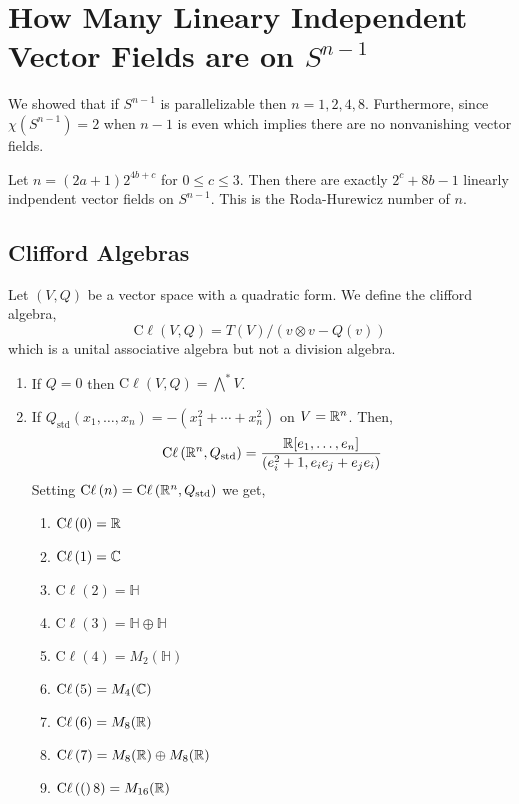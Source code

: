 \documentclass[12pt]{extarticle}
\renewcommand{\H}{\mathbb{H}}
\begin{document}
\begin{prop}

\end{prop}

\section{How Many Lineary Independent Vector Fields are on $S^{n-1}$}

We showed that if $S^{n-1}$ is parallelizable then $n = 1,2,4,8$. Furthermore, since $\chi(S^{n-1}) = 2$ when $n-1$ is even which implies there are no nonvanishing vector fields.

\begin{thm}[Adams]
Let $n = (2a + 1) 2^{4b + c}$ for $0 \le c \le 3$. Then there are exactly $2^c + 8b - 1$ linearly indpendent vector fields on $S^{n-1}$. This is the Roda-Hurewicz number of $n$.
\end{thm}

\subsection{Clifford Algebras}

\newcommand{\Cl}[1]{\mathrm{C}\ell \left( #1 \right)}

\begin{defn}
Let $(V, Q)$ be a vector space with a quadratic form. We define the clifford algebra, 
\[ \Cl{V,Q} = T(V) / (v \otimes v - Q(v)) \] 
which is a unital associative algebra but not a division algebra. 
\end{defn}

\begin{example}
\begin{enumerate}
\item If $Q = 0$ then $\Cl{V, Q} = \bigwedge^{*} V$.
\item If $Q_{\mathrm{std}}(x_1, \dots, x_n) = -(x_1^2 + \cdots + x_n^2)$ on $V = \mathbb{R}^n$. Then,
\[ \Cl{\R^n, Q_{\mathrm{std}}} = \frac{\R[e_1, \dots, e_n]}{(e_i^2 + 1, e_i e_j + e_j e_i)} \] Setting $\Cl{n} = \Cl{\R^n, Q_{\mathrm{std}}}$ we get,
\begin{enumerate}
\item $\Cl{0} = \R$
\item $\Cl{1} = \C$
\item $\Cl{2} = \H$
\item $\Cl{3} = \H \oplus \H$
\item $\Cl{4} = M_{2}(\H)$
\item $\Cl{5} = M_{4}(\C)$
\item $\Cl{6} = M_8(\R)$
\item $\Cl{7} = M_8(\R) \oplus M_8(\R)$
\item $\Cl(8) = M_{16}(\R)$
\end{enumerate}
\end{enumerate}
\end{example}
\end{document}

